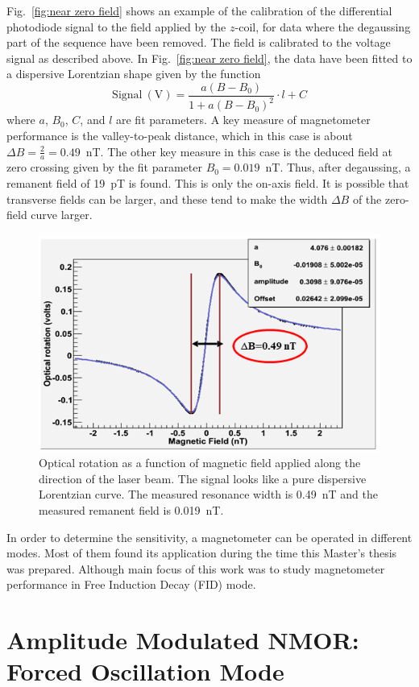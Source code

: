 Fig.~\ref{fig:near zero field} shows an example of the calibration of
the differential photodiode signal to the field applied by the
$z$-coil, for data where the degaussing part of the sequence have been
removed.  The field is calibrated to the voltage signal as described
above.  In Fig.~\ref{fig:near zero field}, the data have been fitted
to a dispersive Lorentzian shape given by the function
\begin{equation}
\mathrm{Signal~(V)}=\frac{a(B-B_0)}{1+a(B-B_0)^2}\cdot l+C
\end{equation}
where $a$, $B_0$, $C$, and $l$ are fit parameters.  A key measure of
magnetometer performance is the valley-to-peak distance, which in this
case is about $\Delta B=\frac{2}{a}=0.49$~nT.  The other key measure
in this case is the deduced field at zero crossing given by the fit
parameter $B_0=0.019$~nT.  Thus, after degaussing, a remanent field of
19~pT is found.  This is only the on-axis field.  It is possible that
transverse fields can be larger, and these tend to make the width
$\Delta B$ of the zero-field curve larger.

\begin{figure}[h]
\centering\includegraphics[width=0.7\linewidth]{figures/near_zero_field}
\caption{Optical rotation as a function of magnetic field applied
  along the direction of the laser beam. The signal looks like a pure
  dispersive Lorentzian curve. The measured resonance width is 0.49~nT
  and the measured remanent field is 0.019~nT.\label{fig:near zero
    field}}
\end{figure}

In order to determine the sensitivity, a magnetometer can be operated
in different modes. Most of them found its application during the time
this Master's thesis was prepared. Although main focus of this work
was to study magnetometer performance in Free Induction Decay (FID)
mode.

\section{Amplitude Modulated NMOR:  Forced Oscillation Mode}

